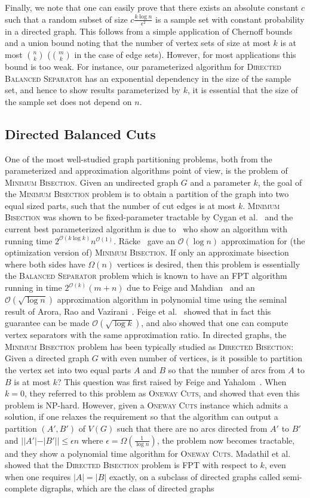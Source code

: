 \documentclass[11pt]{article}
\newcommand{\OO}{\mathcal{O}}
\newcommand{\DBS}{{\textsc{Directed Bisection}}{}}
\newcommand{\MB}{{\textsc{Minimum Bisection}}{}}
\newcommand{\BS}{{\textsc{Balanced Separator}}}
\newcommand{\OC}{{\textsc{Oneway Cuts}}}
\newcommand{\DB}{{\textsc{Directed Balanced Separator}}}
\begin{document}
Finally, we note that one can easily prove that there exists an absolute constant $c$ such that a random subset of size $c\frac{k \log n}{\epsilon^2}$ is a sample set with constant probability in a directed graph. This follows from a simple application of Chernoff bounds and a union bound noting that the number of vertex sets of size at most $k$ is at most ${n \choose k}$ (${m \choose k}$ in the case of edge sets). However, for most applications this bound is too weak. For instance, our parameterized algorithm for \DB{} has an exponential dependency in the size of the sample set, and hence to show results parameterized by $k$, it is essential that the size of the sample set does not depend on $n$.


\subsection{Directed Balanced Cuts} One of the most well-studied graph partitioning problems, both from the parameterized and approximation algorithms point of view, is the problem of \MB{}. Given an undirected graph $G$ and a parameter $k$, the goal of the \MB{} problem is to obtain a partition of the graph into two equal sized parts, such that the number of cut edges is at most $k$. \MB{} was shown to be fixed-parameter tractable by Cygan et al.~\cite{cygan2014minimum} and the current best parameterized algorithm is due to~\cite{cygan2020randomized} who show an algorithm with running time $2^{\OO(k \log k)}n^{\OO(1)}$. Räcke~\cite{racke2008optimal} gave an $\OO(\log n)$ approximation for (the optimization version of) \MB. If only an approximate bisection where both sides have $\Omega(n)$ vertices is desired, then this problem is essentially the \BS{} problem which is known to have an FPT algorithm running in time $2^{\OO(k)}(m + n)$ due to Feige and Mahdian~\cite{fm06} and an $\OO(\sqrt{\log n})$ approximation algorithm in polynomial time using the seminal result of Arora, Rao and Vazirani~\cite{arora2009expander}. Feige et al.~\cite{feige2005improved} showed that in fact this guarantee can be made $\OO(\sqrt{\log k})$, and also showed that one can compute vertex separators with the same approximation ratio. In directed graphs, the \MB{} problem has been typically studied as \DBS: Given a directed graph $G$ with even number of vertices, is it possible to partition the vertex set into two equal parts $A$ and $B$ so that the number of arcs from $A$ to $B$ is at most $k$? This question was first raised by Feige and Yahalom~\cite{feige2003complexity}. When $k = 0$, they referred to this problem as \OC{}, and showed that even this problem is NP-hard. However, given a \OC{} instance which admits a solution, if one relaxes the requirement so that the algorithm can output a partition $(A',B')$ of $V(G)$ such that there are no arcs directed from $A'$ to $B'$ and $||A'| - |B'|| \leq \epsilon n$ where $\epsilon = \Omega(\frac{1}{\log n})$, the problem now becomes tractable, and they show a polynomial time algorithm for \OC. Madathil et al.~\cite{madathil2021sub} showed that the \DBS{} problem is FPT with respect to $k$, even when one requires $|A| = |B|$ exactly, on a subclass of directed graphs called semi-complete digraphs, which are the class of directed graphs 
\end{document}
